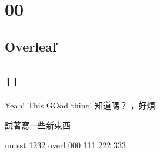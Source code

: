 
\chapter{00}
\section{Overleaf}
\section{11}

Yeah!
This
GOod thing! 知道嗎？
，好煩

試著寫一些新東西


uu
sst
1232
overl
000
111
222
333